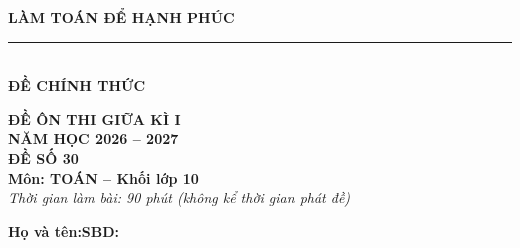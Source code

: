 \documentclass[12pt,a4paper]{article}
\begin{document}
\noindent
\begin{minipage}[c]{0.38\textwidth}
    \centering
    \textbf{LÀM TOÁN ĐỂ HẠNH PHÚC}\\[-2pt]
    \rule{3.2cm}{0.6pt}\\[3pt]
    \textbf{ĐỀ CHÍNH THỨC}
\end{minipage}\hfill
\begin{minipage}[c]{0.35\textwidth}
    \centering
    \textbf{ĐỀ ÔN THI GIỮA KÌ I}\\
    \textbf{NĂM HỌC 2026 -- 2027}\\[2pt]
    \textbf{ĐỀ SỐ 30}\\
    \textbf{Môn: TOÁN -- Khối lớp 10}\\
    \textit{\small Thời gian làm bài: 90 phút (không kể thời gian phát đề)}
\end{minipage}

\vspace{0.03cm}
\noindent
\begin{minipage}[b]{0.78\textwidth}
    \textbf{Họ và tên:}\dotfill\textbf{SBD:}\makebox[3.5cm]{\dotfill}
\end{minipage}\hfill
\begin{minipage}[b]{0.20\textwidth}
    \hfill
    \setlength{\fboxrule}{0.8pt}%
\end{minipage}
\vspace{0.03cm}
\end{document}
